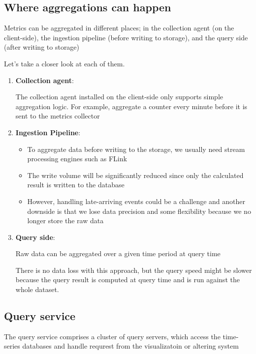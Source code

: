 \documentclass{report}
\theoremstyle{definition}
\let\oldsubsection\subsection
\renewcommand{\subsection}{\oldsubsection*}
\begin{document}
\subsection{Where aggregations can happen}

Metrics can be aggregated in different places; in the collection agent (on the client-side), the ingestion pipeline (before writing to storage), and the query side (after writing to storage)

Let's take a closer look at each of them.

\begin{enumerate}
\item
\textbf{Collection agent}:

The collection agent installed on the client-side only supports simple aggregation logic. For example, aggregate a counter every minute before it is sent to the metrics collector

\item

\textbf{Ingestion Pipeline}:

\begin{itemize}
\item
To aggregate data before writing to the storage, we usually need stream processing engines such as FLink
\item
The write volume will be significantly reduced since only the calculated result is written to the database
\item
However, handling late-arriving events could be a challenge and another downside is that we lose data precision and some flexibility because we no longer store the raw data
\end{itemize}
\item
\textbf{Query side}:

Raw data can be aggregated over a given time period at query time

There is no data loss with this approach, but the query speed might be slower because the query result is computed at query time and is run against the whole dataset.

\end{enumerate}

\subsection{Query service}

The query service comprises a cluster of query servers, which access the time-series databases and handle requrest from the visualizatoin or altering system
\end{document}
